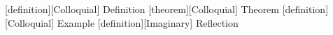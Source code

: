[definition]{[Colloquial] Definition}{\bfseries}{\itshape}
[theorem]{[Colloquial] Theorem}{\bfseries}{\itshape}
[definition]{[Colloquial] Example}{\bfseries}{\itshape}
[definition]{[Imaginary] Reflection}{\bfseries}{\itshape}
